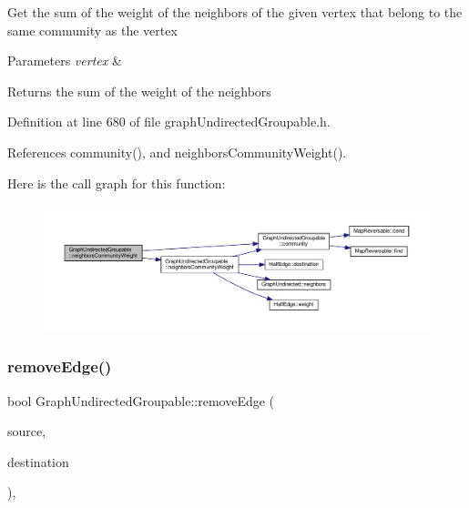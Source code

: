 Get the sum of the weight of the neighbors of the given vertex that belong to the same community as the vertex


\begin{DoxyParams}{Parameters}
{\em vertex} & \\
\hline
\end{DoxyParams}
\begin{DoxyReturn}{Returns}
the sum of the weight of the neighbors 
\end{DoxyReturn}


Definition at line 680 of file graph\+Undirected\+Groupable.\+h.



References community(), and neighbors\+Community\+Weight().

Here is the call graph for this function\+:
\nopagebreak
\begin{figure}[H]
\begin{center}
\leavevmode
\includegraphics[width=350pt]{classGraphUndirectedGroupable_ae11062420fb89f450762eb3456b18f8f_cgraph}
\end{center}
\end{figure}
\mbox{\label{classGraphUndirectedGroupable_ad1a488cc292d7e63d289f598aeaaacd6}} 
\subsubsection{\texorpdfstring{remove\+Edge()}{removeEdge()}\hspace{0.1cm}{\footnotesize\ttfamily [1/2]}}
{\footnotesize\ttfamily bool Graph\+Undirected\+Groupable\+::remove\+Edge (\begin{DoxyParamCaption}\item[{const \hyperlink{edge_8h_a5fbd20c46956d479cb10afc9855223f6}{type\+Vertex} \&}]{source,  }\item[{const \hyperlink{edge_8h_a5fbd20c46956d479cb10afc9855223f6}{type\+Vertex} \&}]{destination }\end{DoxyParamCaption})\hspace{0.3cm}{\ttfamily [inline]}, {\ttfamily [virtual]}}

